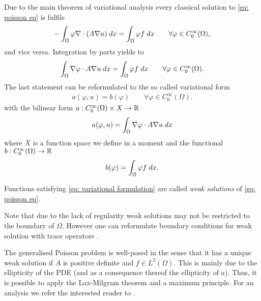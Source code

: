Due to the main theorem of variational analysis every classical solution to \eqref{eq: poisson eq} is fulfils 
\begin{align}
	-\int_{\Omega} {{\varphi \nabla \cdot (A \nabla u)}\;dx}=
	 \int_{\Omega} {{\varphi f}\;dx} \qquad \forall \varphi \in C_0^\infty(\Omega), \label{eq: variational form}
\end{align}
and vice versa.
Integration by parts yields to
\begin{align*}
	\myIntX \Omega {\nabla \varphi  \cdot A\nabla u}
	= \myIntX  \Omega { \varphi f } \qquad \forall \varphi \in C_0^\infty(\Omega). %
\end{align*}
The last statement can be reformulated to the so called variational form 
\begin{align}
a(\varphi,u)  = b(\varphi) \qquad \forall \varphi \in C_0^\infty(\Omega). \label{eq: variational formulation}
\end{align}
with the bilinear form $a:C_0^\infty(\Omega) \times X \rightarrow \mathbb{R}$
\begin{align*}
a(\varphi,u) = \int_{\Omega} {{ \nabla \varphi  \cdot A\nabla u }\;dx}
\end{align*}
where $X$ is a function space we define in a moment and the functional $b:C_0^\infty(\Omega) \rightarrow \mathbb{R}$
\begin{align*}
 b(\varphi)  = \int_{\Omega} {{ \varphi f}\;dx}.
\end{align*}


\begin{definition}
	Functions satisfying \eqref{eq: variational formulation} are called \emph{weak solutions} of \eqref{eq: poisson eq}.
\end{definition}
Note that due to the lack of regularity weak solutions may not be restricted to the boundary of $\Omega$. However one can reformulate boundary conditions for weak solution with trace operators \cite[Section 5.5]{Evans1998}.

The generalised Poisson problem is well-posed in the sense that it has a unique weak solution if $A$ is positive definite and $f\in L^2(\Omega)$. This is mainly due to the ellipticity of the PDE (and as a consequence thereof the ellipticity of $a$). Thus, it is possible to apply the Lax-Milgram theorem and a maximum principle. For an analysis we refer the interested reader to \cite[Chapter~6]{Evans1998}.


